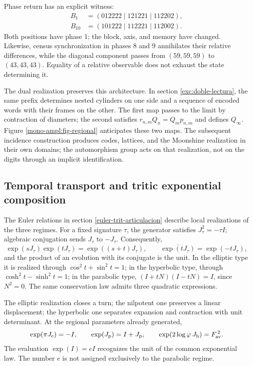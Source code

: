Phase return has an explicit witness:
\[
 \begin{aligned}
 B_1&=(012222\mid121221\mid112202),\\
 B_{10}&=(101222\mid112221\mid112002).
 \end{aligned}
\]
Both positions have phase \(1\); the block, axis, and memory have
changed. Likewise, census synchronization in phases \(8\) and
\(9\) annihilates their relative differences, while the diagonal component
passes from \((59,59,59)\) to \((43,43,43)\). Equality of a relative
observable does not exhaust the state determining it.

The dual realization preserves this architecture. In section
\ref{exc:doble-lectura}, the same prefix determines nested
cylinders on one side and a sequence of encoded words with their frames on the other.
The first map passes to the limit by contraction of diameters; the second
satisfies \(r_{n,m}Q_n=Q_mp_{n,m}\) and defines \(Q_\infty\).
Figure \ref{mono-ampl:fig-regional} anticipates these two maps.
The subsequent incidence construction produces codes, lattices, and the
Moonshine realization in their own domains; the automorphism group
acts on that realization, not on the digits through an implicit
identification.



\subsection{Temporal transport and tritic exponential composition}
\label{mono-ampl:euler}

The Euler relations in section \ref{euler-trit-articulacion}
describe local realizations of the three regimes. For a fixed
signature \(\tau\), the generator satisfies \(J_\tau^2=-\tau I\); algebraic
conjugation sends \(J_\tau\) to \(-J_\tau\). Consequently,
\[
 \exp(sJ_\tau)\exp(tJ_\tau)=\exp((s+t)J_\tau),\qquad
 \overline{\exp(tJ_\tau)}=\exp(-tJ_\tau),
\]
and the product of an evolution with its conjugate is the unit. In the elliptic
type it is realized through \(\cos^2t+\sin^2t=1\); in the hyperbolic type,
through \(\cosh^2t-\sinh^2t=1\); in the parabolic type,
\((I+tN)(I-tN)=I\), since \(N^2=0\). The same conservation law
admits three quadratic expressions.

The elliptic realization closes a turn; the nilpotent one preserves a
linear displacement; the hyperbolic one separates expansion and contraction with
unit determinant. At the regional parameters already generated,
\[
 \exp(\pi J_{\mathrm e})=-I,\qquad
 \exp(J_{\mathrm p})=I+J_{\mathrm p},\qquad
 \exp(2\log\varphi\,J_{\mathrm h})=F_{\rm av}^{\,2}.
\]
The evaluation \(\exp(I)=eI\) recognizes the unit of the common
exponential law. The number \(e\) is not assigned exclusively to the parabolic regime.

